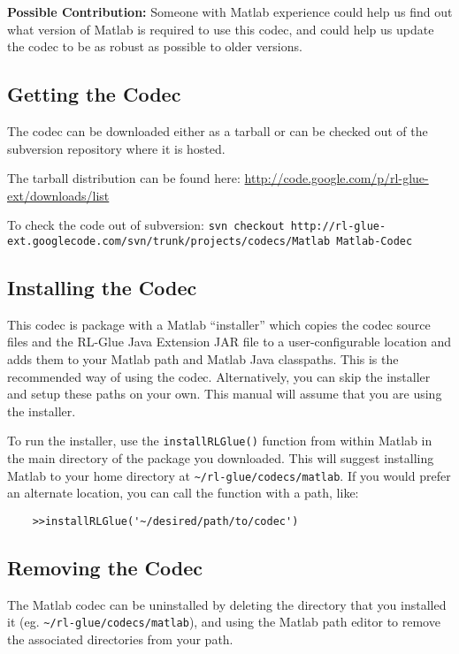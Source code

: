 \documentclass[11pt]{article}
\begin{document}
\textbf{Possible Contribution: }Someone with Matlab experience could help us find out what version of Matlab is required to use this codec, and could help us update the codec
to be as robust as possible to older versions.

\subsection{Getting the Codec}
The codec can be downloaded either as a tarball or can be checked out of the subversion repository where it is hosted.

The tarball distribution can be found here:\newline
\url{http://code.google.com/p/rl-glue-ext/downloads/list}


To check the code out of subversion:\newline
\small \texttt{svn checkout http://rl-glue-ext.googlecode.com/svn/trunk/projects/codecs/Matlab Matlab-Codec} \normalsize

\subsection{Installing the Codec}
This codec is package with a Matlab ``installer'' which copies the codec source files and the RL-Glue Java Extension JAR file to a user-configurable location and adds them to your Matlab path and Matlab Java classpaths.  This is the recommended way of using the codec.  Alternatively, you can skip the installer and setup these paths on your own.   This manual will assume that you are using the installer.

To run the installer, use the \texttt{installRLGlue()} function from within Matlab in the main directory of the package you downloaded.  This will suggest installing Matlab to your home directory at \texttt{\~{}/rl-glue/codecs/matlab}.  If you would prefer an alternate location, you can call the function with a path, like:
\begin{verbatim}
	>>installRLGlue('~/desired/path/to/codec')
\end{verbatim}

\subsection{Removing the Codec}
The Matlab codec can be uninstalled by deleting the directory that you installed it (eg. \texttt{\~{}/rl-glue/codecs/matlab}), and using the Matlab path editor to remove the associated directories from your path.
\end{document}
